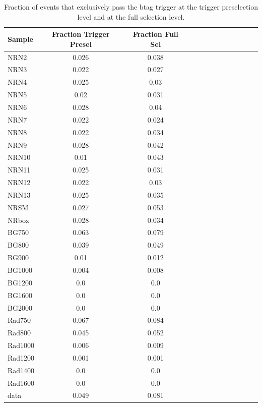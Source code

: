 \begin{table}[h]
\begin{tabular}{|l|c|c|c|c|c|c|c|c|c|c|c|c|}
\hline
Sample & Fraction Trigger Presel & Fraction Full Sel\\ \hline
NRN2 & 0.026 & 0.038\\
NRN3 & 0.022 & 0.027\\
NRN4 & 0.025 & 0.03\\
NRN5 & 0.02 & 0.031\\
NRN6 & 0.028 & 0.04\\
NRN7 & 0.022 & 0.024\\
NRN8 & 0.022 & 0.034\\
NRN9 & 0.028 & 0.042\\
NRN10 & 0.01 & 0.043\\
NRN11 & 0.025 & 0.031\\
NRN12 & 0.022 & 0.03\\
NRN13 & 0.025 & 0.035\\
NRSM & 0.027 & 0.053\\
NRbox & 0.028 & 0.034\\
BG750 & 0.063 & 0.079\\
BG800 & 0.039 & 0.049\\
BG900 & 0.01 & 0.012\\
BG1000 & 0.004 & 0.008\\
BG1200 & 0.0 & 0.0\\
BG1600 & 0.0 & 0.0\\
BG2000 & 0.0 & 0.0\\
Rad750 & 0.067 & 0.084\\
Rad800 & 0.045 & 0.052\\
Rad1000 & 0.006 & 0.009\\
Rad1200 & 0.001 & 0.001\\
Rad1400 & 0.0 & 0.0\\
Rad1600 & 0.0 & 0.0\\
data & 0.049 & 0.081\\
\hline
\end{tabular}
\caption{Fraction of events that exclusively pass the btag trigger at the trigger preselection level and at the full selection level.}
\label{tab:btagonlytrig}
\end{table}

